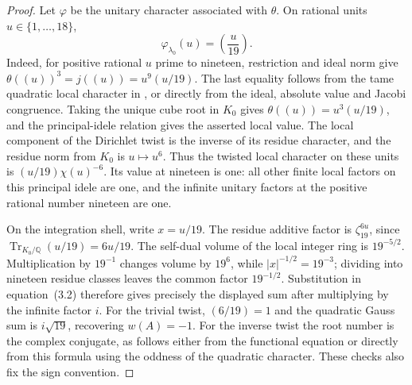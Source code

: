 \begin{proof}
Let $\varphi$ be the unitary character associated with
$\theta$.  On rational units $u\in\{1,\ldots,18\}$,
\[
 \varphi_{\lambda_0}(u)=\left(\frac{u}{19}\right).
\]
Indeed, for positive rational $u$ prime to nineteen,
restriction and ideal norm give
$\theta((u))^3=j((u))=u^9(u/19)$.
The last equality follows from the tame quadratic local
character in \citet[equation~(3.14), author p.~16]{ShuExpanded2021}, or
directly from the ideal, absolute value and Jacobi
congruence.  Taking the unique cube root in $K_0$ gives
$\theta((u))=u^3(u/19)$, and the principal-idele relation
gives the asserted local value.  The local component of the
Dirichlet twist is the inverse of its residue character,
and the residue norm from $K_0$ is $u\mapsto u^6$.
Thus the twisted local character on these units is
$(u/19)\chi(u)^{-6}$.  Its value at nineteen is one:
all other finite local factors on this principal idele
are one, and the infinite unitary factors at the positive
rational number nineteen are one.

On the integration shell, write $x=u/19$.  The residue
additive factor is $\zeta_{19}^{6u}$, since
$\operatorname{Tr}_{K_0/\mathbb Q}(u/19)=6u/19$.
The self-dual volume of the local integer ring is
$19^{-5/2}$.  Multiplication by $19^{-1}$ changes volume
by $19^6$, while $|x|^{-1/2}=19^{-3}$; dividing into
nineteen residue classes leaves the common factor
$19^{-1/2}$.  Substitution in equation~(3.2) therefore
gives precisely the displayed sum after multiplying by
the infinite factor $i$.
For the trivial twist, $(6/19)=1$ and the quadratic Gauss
sum is $i\sqrt{19}$, recovering $w(A)=-1$.  For the
inverse twist the root number is the complex conjugate,
as follows either from the functional equation or directly
from this formula using the oddness of the quadratic
character.  These checks also fix the sign convention.

\end{proof}

